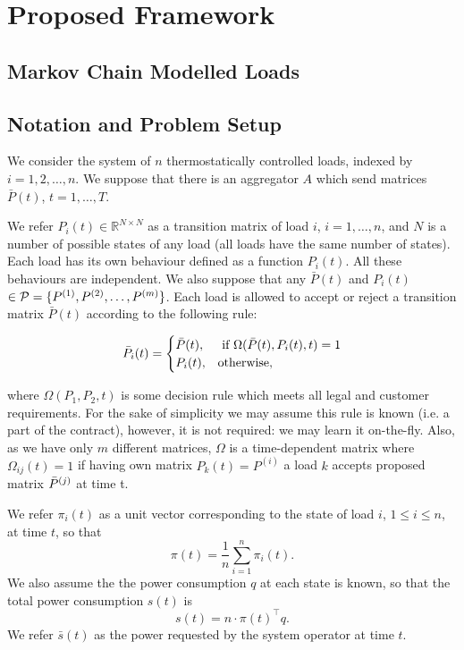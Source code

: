 \chapter{Proposed Framework}
\section{Markov Chain Modelled Loads} 

\section{Notation and Problem Setup} We consider the system of $n$ thermostatically controlled loads, indexed by $i = 1, 2, \dots, n$. We suppose that there is an aggregator $A$ which send matrices ${\bar P}(t)$, $t=1, \dots, T$.

We refer $P_i(t) \in \mathbb{R}^{N\times N}$ as a transition matrix of load $i$, $i = 1, \dots, n$, and $N$ is a number of possible states of any load (all loads have the same number of states). Each load has its own behaviour defined as a function $P_i(t)$. All these behaviours are independent. We also suppose that any ${\bar P}(t)$ and $P_{i}(t)$  $\in {\cal P} = \{P^{(1)}, P^{(2)}, \dots, P^{(m)}\}$. Each load is allowed to accept or reject a transition matrix ${\bar P}(t)$ according to the following rule: 


\[
    {\bar P_i}(t) = 
    \begin{cases}
    {\bar P}(t), & \text{ if } \Omega({\bar P}(t),P_{i}(t), t) = 1\\
    P_i(t), & \text{otherwise},
    \end{cases}
\]

where $\Omega(P_1, P_2, t)$ is some decision rule which meets all legal and customer requirements. For the sake of simplicity we may assume this rule is known (i.e. a part of the contract), however, it is not required: we may learn it on-the-fly. Also, as we have only $m$ different matrices, $\Omega$ is a time-dependent matrix where $\Omega_{ij}(t) = 1$ if having own matrix $P_k(t) = P^{(i)}$ a load $k$ accepts proposed matrix ${\bar P}^{(j)}$ at time t. 


%
We refer $\pi_i(t)$ as a unit vector corresponding to the state of load $i$, $1\le i \le n$, at time $t$, so that 
\[\pi(t) = \frac{1}{n}\sum_{i=1}^n \pi_i(t).\]
We also assume the the power consumption $q$ at each state is known, so that the total power consumption $s(t)$ is 
\[s(t) = n\cdot \pi(t)^\top q.\]
We refer ${\bar s}(t)$ as the power requested by the system operator at time $t$. 

